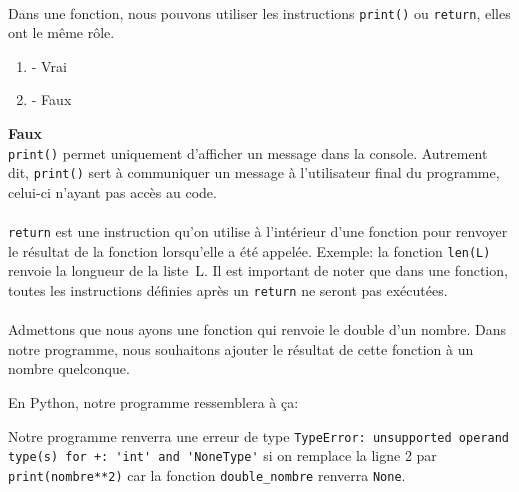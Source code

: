 \begin{Exercice}[2 minutes]\\
Dans une fonction, nous pouvons utiliser les instructions \lstinline{print()} ou \lstinline{return}, elles ont le même rôle.
\begin{enumerate}
    \item - Vrai
    \item - Faux
\end{enumerate}
\begin{solution}
    \textbf{Faux}\\
    \lstinline{print()} permet uniquement d'afficher un message dans la console. Autrement dit, \lstinline{print()} sert à communiquer un message à l'utilisateur final du programme, celui-ci n'ayant pas accès au code.\\\\
    \lstinline{return} est une instruction qu'on utilise à l'intérieur d'une fonction pour renvoyer le résultat de la fonction lorsqu'elle a été appelée. Exemple: la fonction \lstinline{len(L)} renvoie la longueur de la liste~L. Il est important de noter que dans une fonction, toutes les instructions définies après un \lstinline{return} ne seront pas exécutées. \\\\
    Admettons que nous ayons une fonction qui renvoie le double d'un nombre. Dans notre programme, nous souhaitons ajouter le résultat de cette fonction à un nombre quelconque.
\end{solution}
\begin{solution}
    En Python, notre programme ressemblera à ça:
    

    Notre programme renverra une erreur de type \lstinline{TypeError: unsupported operand type(s) for +: 'int' and 'NoneType'} si on remplace la ligne 2 par \lstinline{print(nombre**2)} car la fonction \lstinline{double_nombre} renverra \lstinline{None}.
\end{solution}
\end{Exercice}


